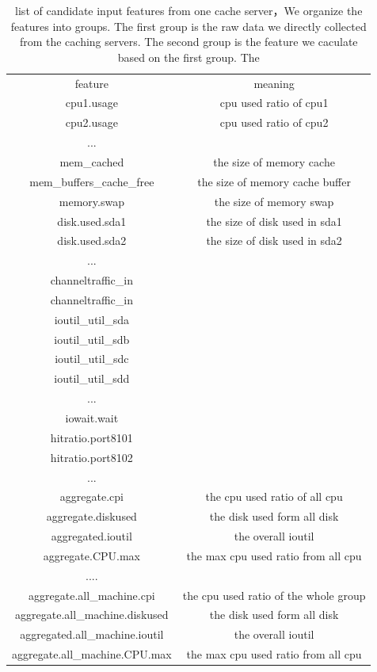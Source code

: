 \documentclass[5p]{elsarticle}
\begin{document}
\begin{table}[]
\centering
\begin{tabular}{|c|c|}
\hline  
feature &   meaning\\
cpu1.usage &   cpu used ratio of cpu1\\
cpu2.usage &   cpu used ratio of cpu2\\
... & \\
mem\_cached & the size of memory cache\\
mem\_buffers\_cache\_free & the size of memory cache buffer\\
memory.swap  & the size of memory swap\\ 
disk.used.sda1 & the size of disk used in sda1\\
disk.used.sda2 & the size of disk used in sda2\\
... & \\
channeltraffic\_in   & \\
channeltraffic\_in   & \\
ioutil\_util\_sda & \\
ioutil\_util\_sdb & \\
ioutil\_util\_sdc & \\
ioutil\_util\_sdd & \\
... & \\
iowait.wait & \\
hitratio.port8101 & \\
hitratio.port8102 & \\
... & \\
\hline 
aggregate.cpi & the cpu used ratio of all cpu\\
aggregate.diskused & the disk used form all disk \\
aggregated.ioutil & the overall ioutil \\
aggregate.CPU.max & the max cpu used ratio from all cpu \\
....  & \\
\hline 
aggregate.all\_machine.cpi & the cpu used ratio of the whole group\\
aggregate.all\_machine.diskused & the disk used form all disk \\
aggregated.all\_machine.ioutil & the overall ioutil \\
aggregate.all\_machine.CPU.max & the max cpu used ratio from all cpu \\
\hline 
\end{tabular}
\caption{list of candidate input features from one cache server，We organize the features into groups. The first group is the raw data we directly collected from the caching servers. The second group is the feature we caculate based on the first group. The}
\label{my-label}
\end{table}
\end{document}
